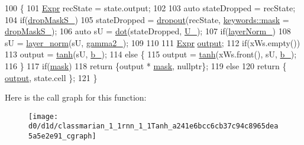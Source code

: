 \begin{DoxyCode}
100                                         \{
101     \hyperlink{namespacemarian_a498d8baf75b754011078b890b39c8e12}{Expr} recState = state.output;
102 
103     \textcolor{keyword}{auto} stateDropped = recState;
104     \textcolor{keywordflow}{if}(\hyperlink{classmarian_1_1rnn_1_1Tanh_a2d63dd9420ab8be612c3f5a490afe289}{dropMaskS\_})
105       stateDropped = \hyperlink{namespacemarian_a268400392f22176821c7c4a36733b178}{dropout}(recState, \hyperlink{namespacemarian_1_1keywords_a201bea6bea8108889b63081132cc3cd7}{keywords::mask} = 
      \hyperlink{classmarian_1_1rnn_1_1Tanh_a2d63dd9420ab8be612c3f5a490afe289}{dropMaskS\_});
106     \textcolor{keyword}{auto} sU = \hyperlink{namespacemarian_ad7fbf1ba8e2e04ffdc7d5e4841b5e691}{dot}(stateDropped, \hyperlink{classmarian_1_1rnn_1_1Tanh_a326263946a945185e8cf5c587383aa54}{U\_});
107     \textcolor{keywordflow}{if}(\hyperlink{classmarian_1_1rnn_1_1Tanh_a2f040a380c52e0d19f84e155d14f3967}{layerNorm\_})
108       sU = \hyperlink{namespacemarian_a6202278a9da8ca8a281a6a96e75082f6}{layer\_norm}(sU, \hyperlink{classmarian_1_1rnn_1_1Tanh_a0f3c652c0cf8ddb562e6686c8b3c3eda}{gamma2\_});
109 
110 
111     \hyperlink{namespacemarian_a498d8baf75b754011078b890b39c8e12}{Expr} \hyperlink{namespacetest_a07b64f21658cf1faa97a31563ac979d2}{output};
112     \textcolor{keywordflow}{if}(xWs.empty())
113       output = \hyperlink{namespacemarian_ab84fcdb2b1fa95f89e3921aea4027957}{tanh}(sU, \hyperlink{classmarian_1_1rnn_1_1Tanh_a8270043cd7cbce1118b50835cce625ac}{b\_});
114     \textcolor{keywordflow}{else} \{
115       output = \hyperlink{namespacemarian_ab84fcdb2b1fa95f89e3921aea4027957}{tanh}(xWs.front(), sU, \hyperlink{classmarian_1_1rnn_1_1Tanh_a8270043cd7cbce1118b50835cce625ac}{b\_});
116     \}
117     \textcolor{keywordflow}{if}(\hyperlink{namespacemarian_1_1keywords_a201bea6bea8108889b63081132cc3cd7}{mask})
118       \textcolor{keywordflow}{return} \{output * \hyperlink{namespacemarian_1_1keywords_a201bea6bea8108889b63081132cc3cd7}{mask}, \textcolor{keyword}{nullptr}\};
119     \textcolor{keywordflow}{else}
120       \textcolor{keywordflow}{return} \{ \hyperlink{namespacetest_a07b64f21658cf1faa97a31563ac979d2}{output}, state.cell \};
121   \}
\end{DoxyCode}


Here is the call graph for this function\+:
\nopagebreak
\begin{figure}[H]
\begin{center}
\leavevmode
\texttt{[image: d0/d1d/classmarian\_1\_1rnn\_1\_1Tanh\_a241e6bcc6cb37c94c8965dea5a5e2e91\_cgraph]}
\end{center}
\end{figure}




